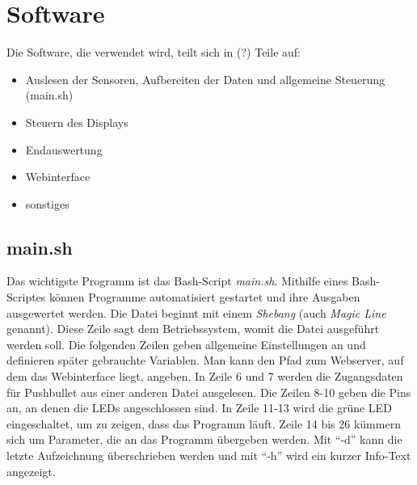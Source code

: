 \chapter{Software}
Die Software, die verwendet wird, teilt sich in (?) Teile auf:
\begin{itemize}
\item Auslesen der Sensoren, Aufbereiten der Daten und allgemeine Steuerung (main.sh)
\item Steuern des Displays
\item Endauswertung
\item Webinterface
\item sonstiges
\end{itemize}

\section{main.sh}
\label{sec:main.sh}

Das wichtigste Programm ist das Bash-Script \textit{main.sh}. Mithilfe eines Bash-Scriptes können Programme automatisiert gestartet und ihre Ausgaben ausgewertet werden.
Die Datei beginnt mit einem \textit{Shebang} (auch \textit{Magic Line} genannt). Diese Zeile sagt dem Betriebssystem, womit die Datei ausgeführt werden soll.
Die folgenden Zeilen geben allgemeine Einstellungen an und definieren später gebrauchte Variablen. Man kann den Pfad zum Webserver, auf dem das Webinterface liegt, angeben. In Zeile 6 und 7 werden die Zugangsdaten für Pushbullet aus einer anderen Datei ausgelesen. Die Zeilen 8-10 geben die Pins an, an denen die LEDs angeschlossen sind. In Zeile 11-13 wird die grüne LED eingeschaltet, um zu zeigen, dass das Programm läuft.
Zeile 14 bis 26 kümmern sich um Parameter, die an das Programm übergeben werden. Mit \enquote{-d} kann die letzte Aufzeichnung überschrieben werden und mit \enquote{-h} wird ein kurzer Info-Text angezeigt.
 

